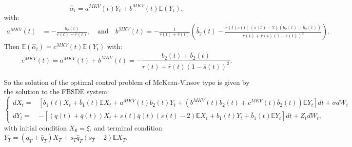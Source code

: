 \documentclass[11pt]{article}
\begin{document}
\begin{equation}
    \hat{\alpha}_t=a^{MKV}(t)Y_t+b^{MKV}(t)\mathbb{E}(Y_t),
    \label{eq:alpha_hat_MKV}
\end{equation}
with:
\begin{equation*}
\begin{split}
    a^{MKV}(t)&=-\frac{b_2(t)}{r(t)+\bar{r}(t)}, \quad \text{and} \quad b^{MKV}(t)=-\frac{1}{r(t)+\bar{r}(t)}\left(\bar{b}_2(t)-\frac{\bar{r}(t)\bar{s}(t)(\bar{s}(t)-2)(b_2(t)+\bar{b}_2(t))}{r(t)+\bar{r}(t)(1-\bar{s}(t))^2} \right).
\end{split}
\end{equation*}
Then $\mathbb{E}(\hat{\alpha}_t)=c^{MKV}(t)\mathbb{E}(Y_t)$ with:
   $$ c^{MKV}(t)=a^{MKV}(t)+b^{MKV}(t)=-\frac{b_2(t)+\bar{b}_2(t)}{r(t)+\bar{r}(t)(1-\bar{s}(t))^2}.$$

So the solution of the optimal control problem of McKean-Vlasov type is given by the solution to the FBSDE system:
\begin{equation}
\left\{
\begin{split}
        dX_t=&\left[b_1(t)X_t+\bar{b}_1(t) \mathbb{E}X_t+a^{MKV}(t)b_2(t)Y_t+(b^{MKV}(t)b_2(t)+c^{MKV}(t)\bar{b}_2(t))\mathbb{E}Y_t\right]dt+\sigma dW_t \\[5pt]
        dY_t=&-\left[(q(t)+\bar{q}(t))X_t+s(t)\bar{q}(t)(s(t)-2)\mathbb{E}X_t+b_1(t)Y_t+\bar{b}_1(t)\mathbb{E}Y_t\right]dt +Z_t dW_t,
\end{split}
\right.
\label{eq:FBSDE_EMKV}
\end{equation}
with initial condition $X_0=\xi$, and terminal condition $Y_T=(q_T+\bar{q}_T)X_T+s_T\bar{q}_T(s_T-2)\mathbb{E}X_T$.
\end{document}
